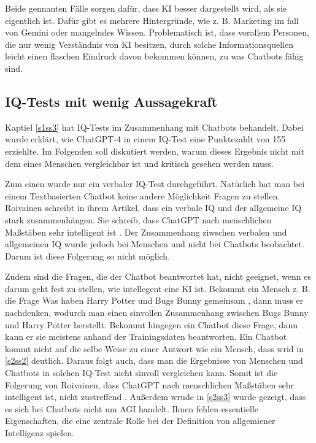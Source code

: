 	Beide gennanten Fälle sorgen dafür, dass KI besser dargestellt wird, als sie eigentlich
	ist. Dafür gibt es mehrere Hintergründe, wie z. B. Marketing im fall von Gemini oder mangelndes
	Wissen. Problematisch ist, dass vorallem Personen, die nur wenig Verständnis von KI besitzen, durch 
	solche Informationsquellen leicht einen flaschen Eindruck davon bekommen können, zu was Chatbots fähig sind.
	
	\clearpage
	\subsection{IQ-Tests mit wenig Aussagekraft}\label{s3ss1}
	Kaptiel \ref{s1ss3} hat IQ-Tests im Zusammenhang mit Chatbots behandelt. Dabei wurde erklärt, wie ChatGPT-4 in einem
	IQ-Test eine Punktezahlt von 155 erziehlte. Im Folgenden soll diskutiert werden, warum dieses Ergebnis nicht mit dem
	eines Menschen vergleichbar ist und kritisch gesehen werden muss.
	
	Zum einen wurde nur ein verbaler IQ-Test durchgeführt. Natürlich hat man bei einem Textbasierten Chatbot 
	keine andere Möglichkeit Fragen zu stellen. Roivainen schreibt in ihrem Artikel, dass ein verbale IQ und der allgemeine IQ
	stark zusammenhängen. Sie schreib, dass ChatGPT nach menschlichen Maßstäben sehr intelligent ist \cite{roivainen23}.
	Der Zusammenhang ziwschen verbalen und allgemeinen IQ wurde jedoch bei Menschen und nicht bei Chatbots beobachtet. Darum
	ist diese Folgerung so nicht möglich.
	
	Zudem sind die Fragen, die der Chatbot beantwortet hat, nicht geeignet, wenn es darum geht fest zu stellen, wie intellegent eine KI ist.
	Bekommt ein Mensch z. B. die Frage \glqq{}Was haben Harry Potter und Bugs Bunny gemeinsam\grqq{} \cite{roivainen23},
	dann muss er nachdenken, wodurch man einen sinvollen Zusammenhang zwischen Bugs Bunny und Harry Potter herstellt.
	Bekommt hingegen ein Chatbot diese Frage, dann kann er sie meistens anhand der Trainingsdaten beantworten. Ein Chatbot
	kommt nicht auf die selbe Weise zu einer Antwort wie ein Mensch, dass wrid in \ref{s2ss2} deutlich. Daraus folgt auch,
	dass man die Ergebnisse von Menschen und Chatbots in solchen IQ-Test nicht sinvoll vergleichen kann. Somit ist die
	Folgerung von Roivainen, dass ChatGPT nach menschlichen Maßstäben sehr intelligent ist, nicht zustreffend \cite{roivainen23}. 
	Außerdem wrude in \ref{s2ss3} wurde gezeigt, dass es sich bei Chatbots nicht um AGI handelt. Ihnen fehlen essentielle
	Eigenschaften, die eine zentrale Rolle bei der Definition von allgemiener Intelligenz spielen. 	
	
